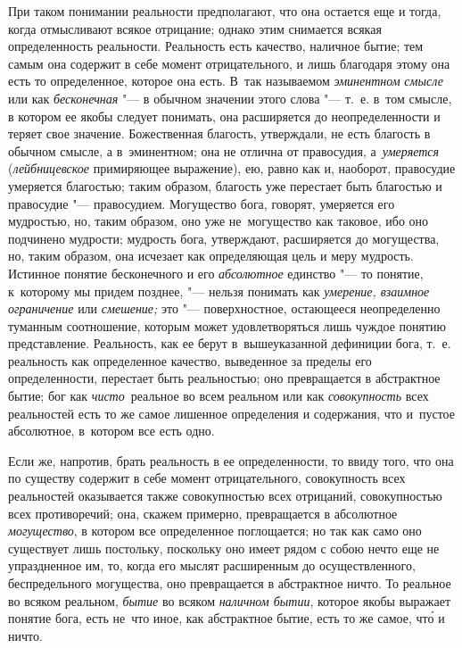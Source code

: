 \label{bkm:bm73b}При таком понимании реальности предполагают, что она
остается еще и тогда, когда отмысливают всякое отрицание; однако этим снимается
всякая определенность реальности. Реальность есть качество, наличное бытие; тем
самым она содержит в себе момент отрицательного, и лишь благодаря этому она
есть то определенное, которое она есть. В~так называемом
{\em эминентном} {\em смысле} или как {\em бесконечная} "--- в обычном значении
этого слова "--- т.~е. в~том смысле, в котором ее якобы следует понимать, она
расширяется до неопределенности и теряет свое значение. Божественная благость,
утверждали, не есть благость в обычном смысле, а в~эминентном; она не отлична
от правосудия, а~{\em умеряется} ({\em лейбницевское} примиряющее выражение),
ею, равно как и, наоборот, правосудие умеряется благостью; таким образом,
благость уже перестает быть благостью и правосудие "--- правосудием. Могущество
бога, говорят, умеряется его мудростью, но, таким образом, оно уже
не~могущество как таковое, ибо оно подчинено мудрости; мудрость бога,
утверждают, расширяется до могущества, но, таким образом, она исчезает как
определяющая цель и меру мудрость. Истинное понятие бесконечного и его
{\em абсолютное} единство "--- то понятие, к~которому мы придем позднее, "---
нельзя понимать как {\em умерение, взаимное ограничение} или {\em смешение;}
это "--- поверхностное, остающееся неопределенно туманным соотношение, которым
может удовлетворяться лишь чуждое понятию представление. Реальность, как ее
берут в~вышеуказанной дефиниции бога, т.~е. реальность как определенное
качество, выведенное за пределы его определенности, перестает быть реальностью;
оно превращается в абстрактное бытие; бог как {\em чисто}~реальное во всем
реальном или как {\em совокупность} всех реальностей есть то же самое лишенное
определения и содержания, что и~пустое абсолютное, в~котором все есть одно.

Если же, напротив, брать реальность в ее определенности, то ввиду того, что
она по существу содержит в себе момент отрицательного, совокупность всех
реальностей оказывается также совокупностью всех отрицаний, совокупностью всех
противоречий; она, скажем примерно, превращается в абсолютное {\em могущество},
в котором все определенное поглощается; но так как само оно существует лишь
постольку, поскольку оно имеет рядом с собою нечто еще не упраздненное им, то,
когда его мыслят расширенным до осуществленного, беспредельного могущества, оно
превращается в абстрактное ничто. То реальное во всяком реальном, {\em бытие}
во всяком {\em наличном бытии}, которое якобы выражает понятие бога, есть
не~что иное, как абстрактное бытие, есть то же самое, чт\'{о} и ничто.

